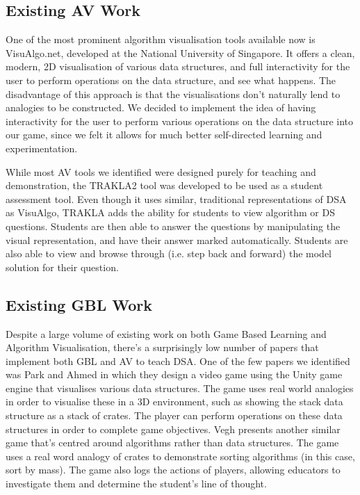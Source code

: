 \documentclass[10pt]{article}
\begin{document}
\subsection{Existing AV Work}
One of the most prominent algorithm visualisation tools available now is VisuAlgo.net\cite{visualgo}, developed at the National University of Singapore. It offers a clean, modern, 2D visualisation of various data structures, and full interactivity for the user to perform operations on the data structure, and see what happens. The disadvantage of this approach is that the visualisations don't naturally lend to analogies to be constructed. We decided to implement the idea of having interactivity for the user to perform various operations on the data structure into our game, since we felt it allows for much better self-directed learning and experimentation.\par
While most AV tools we identified were designed purely for teaching and demonstration, the TRAKLA2\cite{TRAKLA2} tool was developed to be used as a student assessment tool. Even though it uses similar, traditional representations of DSA as VisuAlgo, TRAKLA adds the ability for students to view algorithm or DS questions. Students are then able to answer the questions by manipulating the visual representation, and have their answer marked automatically. Students are also able to view and browse through (i.e. step back and forward) the model solution for their question.
\subsection{Existing GBL Work}
Despite a large volume of existing work on both Game Based Learning and Algorithm Visualisation, there's a surprisingly low number of papers that implement both GBL and AV to teach DSA. One of the few papers we identified was Park and Ahmed\cite{Park} in which they design a video game using the Unity game engine that visualises various data structures. The game uses real world analogies in order to visualise these in a 3D environment, such as showing the stack data structure as a stack of crates. The player can perform operations on these data structures in order to complete game objectives. Vegh\cite{vegh} presents another similar game that's centred around algorithms rather than data structures. The game uses a real word analogy of crates to demonstrate sorting algorithms (in this case, sort by mass). The game also logs the actions of players, allowing educators to investigate them and determine the student's line of thought.
\end{document}
